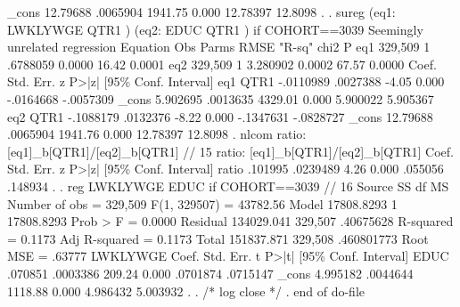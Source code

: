        _cons {\VBAR}   12.79688   .0065904  1941.75   0.000     12.78397     12.8098
{\smallskip}
. 
. sureg (eq1:  LWKLYWGE QTR1 ) (eq2:  EDUC QTR1 ) if COHORT==3039
{\smallskip}
Seemingly unrelated regression
Equation             Obs   Parms        RMSE    "R-sq"       chi2        P
eq1              329,509       1    .6788059    0.0000      16.42   0.0001
eq2              329,509       1    3.280902    0.0002      67.57   0.0000
{\smallskip}
             {\VBAR}      Coef.   Std. Err.      z    P>|z|     [95\% Conf. Interval]
eq1          {\VBAR}
        QTR1 {\VBAR}  -.0110989   .0027388    -4.05   0.000    -.0164668   -.0057309
       _cons {\VBAR}   5.902695   .0013635  4329.01   0.000     5.900022    5.905367
eq2          {\VBAR}
        QTR1 {\VBAR}  -.1088179   .0132376    -8.22   0.000    -.1347631   -.0828727
       _cons {\VBAR}   12.79688   .0065904  1941.76   0.000     12.78397     12.8098
{\smallskip}
. nlcom ratio: [eq1]_b[QTR1]/[eq2]_b[QTR1] // 15
{\smallskip}
       ratio:  [eq1]_b[QTR1]/[eq2]_b[QTR1]
{\smallskip}
             {\VBAR}      Coef.   Std. Err.      z    P>|z|     [95\% Conf. Interval]
       ratio {\VBAR}    .101995   .0239489     4.26   0.000      .055056     .148934
{\smallskip}
. 
. reg LWKLYWGE EDUC if  COHORT==3039 // 16
{\smallskip}
      Source {\VBAR}       SS           df       MS      Number of obs   =   329,509
   F(1, 329507)    =  43782.56
       Model {\VBAR}  17808.8293         1  17808.8293   Prob > F        =    0.0000
    Residual {\VBAR}  134029.041   329,507   .40675628   R-squared       =    0.1173
   Adj R-squared   =    0.1173
       Total {\VBAR}  151837.871   329,508  .460801773   Root MSE        =    .63777
{\smallskip}
    LWKLYWGE {\VBAR}      Coef.   Std. Err.      t    P>|t|     [95\% Conf. Interval]
        EDUC {\VBAR}    .070851   .0003386   209.24   0.000     .0701874    .0715147
       _cons {\VBAR}   4.995182   .0044644  1118.88   0.000     4.986432    5.003932
{\smallskip}
. 
. /* log close */
. 
end of do-file
{\smallskip}
